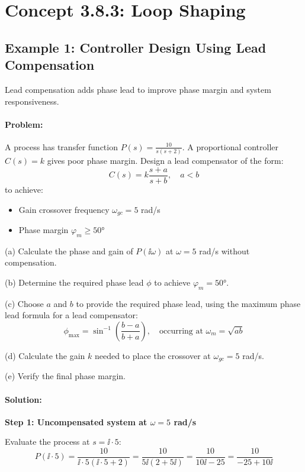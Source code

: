 \documentclass[11pt,a4paper]{article}
\begin{document}
\section{Concept 3.8.3: Loop Shaping}

\subsection{Example 1: Controller Design Using Lead Compensation}

Lead compensation adds phase lead to improve phase margin and system responsiveness.

\paragraph{Problem:}
A process has transfer function $P(s) = \frac{10}{s(s+2)}$. A proportional controller $C(s) = k$ gives poor phase margin. Design a lead compensator of the form:
\[
C(s) = k\frac{s + a}{s + b}, \quad a < b
\]
to achieve:
\begin{itemize}
\item Gain crossover frequency $\omega_{gc} = 5$ rad/s
\item Phase margin $\varphi_m \geq 50°$
\end{itemize}

(a) Calculate the phase and gain of $P(\ii\omega)$ at $\omega = 5$ rad/s without compensation.

(b) Determine the required phase lead $\phi$ to achieve $\varphi_m = 50°$.

(c) Choose $a$ and $b$ to provide the required phase lead, using the maximum phase lead formula for a lead compensator:
\[
\phi_{\max} = \sin^{-1}\left(\frac{b-a}{b+a}\right), \quad \text{occurring at } \omega_m = \sqrt{ab}
\]

(d) Calculate the gain $k$ needed to place the crossover at $\omega_{gc} = 5$ rad/s.

(e) Verify the final phase margin.

\paragraph{Solution:}

\textbf{Step 1: Uncompensated system at $\omega = 5$ rad/s}

Evaluate the process at $s = \ii \cdot 5$:
\[
P(\ii \cdot 5) = \frac{10}{\ii \cdot 5(\ii \cdot 5 + 2)} = \frac{10}{5\ii(2 + 5\ii)} = \frac{10}{10\ii - 25} = \frac{10}{-25 + 10\ii}
\]
\end{document}
